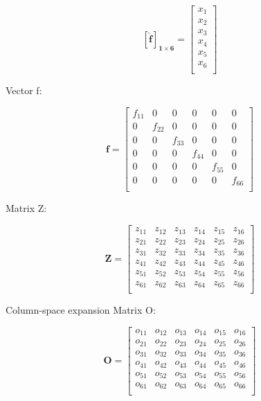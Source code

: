 \documentclass[
  letterpaper,
  DIV=11,
  numbers=noendperiod]{scrreprt}
\begin{document}
\[\mathbf {[\hat{f}]_{1\times 6}} = \left[\begin{array}
{rrr}
x_{1} \\
x_{2} \\
x_{3} \\
x_{4} \\
x_{5} \\
x_{6} \\
\end{array}\right]
\]

Vector f:

\[\mathbf{f} = \left[\begin{array}
{rrr}
f_{11} & 0 & 0 & 0 & 0 & 0 \\
0 & f_{22} & 0 & 0 & 0 & 0 \\
0 & 0 & f_{33} & 0 & 0 & 0 \\
0 & 0 & 0 & f_{44} & 0 & 0 \\
0 & 0 & 0 & 0 & f_{55} & 0 \\
0 & 0 & 0 & 0 & 0 & f_{66} \\
\end{array}\right]
\]

Matrix Z:

\[\mathbf{Z} = \left[\begin{array}
{rrr}
z_{11} & z_{12} & z_{13} & z_{14} & z_{15} & z_{16} \\
z_{21} & z_{22} & z_{23} & z_{24} & z_{25} & z_{26} \\
z_{31} & z_{32} & z_{33} & z_{34} & z_{35} & z_{36} \\
z_{41} & z_{42} & z_{43} & z_{44} & z_{45} & z_{46} \\
z_{51} & z_{52} & z_{53} & z_{54} & z_{55} & z_{56} \\
z_{61} & z_{62} & z_{63} & z_{64} & z_{65} & z_{66} \\
\end{array}\right]
\]

Column-space expansion Matrix O:

\[\mathbf{O} = \left[\begin{array}
{rrr}
o_{11} & o_{12} & o_{13} & o_{14} & o_{15} & o_{16} \\
o_{21} & o_{22} & o_{23} & o_{24} & o_{25} & o_{26} \\
o_{31} & o_{32} & o_{33} & o_{34} & o_{35} & o_{36} \\
o_{41} & o_{42} & o_{43} & o_{44} & o_{45} & o_{46} \\
o_{51} & o_{52} & o_{53} & o_{54} & o_{55} & o_{56} \\
o_{61} & o_{62} & o_{63} & o_{64} & o_{65} & o_{66} \\
\end{array}\right]
\]
\end{document}

